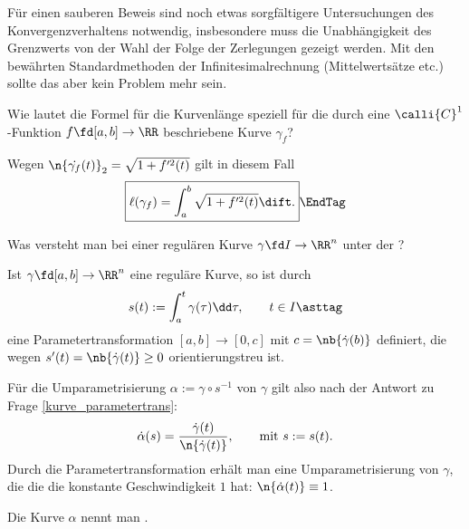 \begin{antwort}
    Für einen sauberen Beweis sind noch etwas sorgfältigere 
    Untersuchungen des Konvergenzverhaltens notwendig, insbesondere 
    muss die Unabhängigkeit des Grenzwerts von der Wahl der 
    Folge der Zerlegungen gezeigt werden. Mit den bewährten  
    Standardmethoden der Infinitesimalrechnung (Mittelwertsätze etc.) 
    sollte das aber kein Problem mehr sein.
    \AntEnd
  \end{antwort}

  \begin{frage}
    Wie lautet die Formel für die Kurvenlänge speziell für die 
    durch eine $\calli{C}^1$-Funktion $f\fd [a,b]\to\RR$ beschriebene 
    Kurve $\gamma_f$? 
  \end{frage}

  \begin{antwort}
    
    Wegen 
    $\n{ \dot{\gamma_f}(t) }_2 = \sqrt{1+f'^2(t)}$ gilt in diesem Fall 
    \[
    \boxed{ \ell( \gamma_f ) = \int_a^b \sqrt{1+f'^2 (t ) }\dift. }\EndTag
    \]
  \end{antwort} 


  \begin{frage}
    Was versteht man bei einer regulären Kurve 
    $\gamma \fd I \to \RR^n$ unter der ?
  \end{frage}

  \begin{antwort}
    Ist $\gamma\fd [a,b]\to \RR^n$ eine reguläre Kurve, so ist durch 
    \[
    s( t ) := \int_a^t \gamma(\tau) \dd \tau, \qquad t\in I \asttag
    \]
    eine Parametertransformation $[a,b]\to[0,c]$ mit $c=\nb{\dot{\gamma}(b)}$ 
    definiert, die 
    wegen $s'(t)=\nb{\dot{\gamma}(t)} \ge 0$ orientierungstreu ist.   

    Für die Umparametrisierung 
    $\alpha := \gamma\circ s^{-1}$ von $\gamma$ gilt also 
    nach der Antwort zu Frage \ref{kurve_parametertrans}:
    \[
    \dot{\alpha}(s) = \frac{\dot{\gamma}(t)}{ \n{\dot{\gamma}(t)} }, \qquad
    \text{mit $s := s(t)$}. 
    \] 
    Durch die Parametertransformation {\astref} erhält man eine 
    Umparametrisierung von $\gamma$, die 
    die die konstante Geschwindigkeit $1$ hat: $\n{\dot{\alpha}(t)}\equiv 1$. 

    Die Kurve $\alpha$ nennt man   
    . 
    \AntEnd
  \end{antwort} 

